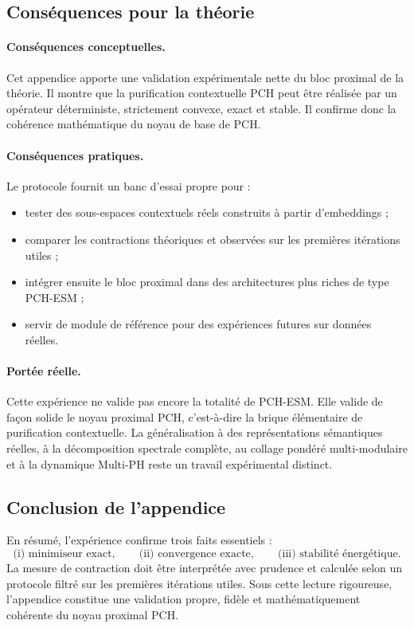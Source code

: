 \documentclass[11pt,a4paper]{article}
\newcommand{\1}{\mathbf 1}
\begin{document}
\subsection{Conséquences pour la théorie}

\paragraph{Conséquences conceptuelles.}
Cet appendice apporte une validation expérimentale nette du bloc proximal de la théorie.
Il montre que la purification contextuelle PCH peut être réalisée par un opérateur déterministe, strictement convexe, exact et stable.
Il confirme donc la cohérence mathématique du noyau de base de PCH.

\paragraph{Conséquences pratiques.}
Le protocole fournit un banc d'essai propre pour :
\begin{itemize}
    \item tester des sous-espaces contextuels réels construits à partir d'embeddings ;
    \item comparer les contractions théoriques et observées sur les premières itérations utiles ;
    \item intégrer ensuite le bloc proximal dans des architectures plus riches de type PCH-ESM ;
    \item servir de module de référence pour des expériences futures sur données réelles.
\end{itemize}

\paragraph{Portée réelle.}
Cette expérience ne valide pas encore la totalité de PCH-ESM.
Elle valide de façon solide le noyau proximal PCH, c'est-à-dire la brique élémentaire de purification contextuelle.
La généralisation à des représentations sémantiques réelles, à la décomposition spectrale complète, au collage pondéré multi-modulaire et à la dynamique Multi-PH reste un travail expérimental distinct.

\subsection{Conclusion de l'appendice}

En résumé, l'expérience confirme trois faits essentiels :
\[
\text{(i) minimiseur exact},
\qquad
\text{(ii) convergence exacte},
\qquad
\text{(iii) stabilité énergétique}.
\]
La mesure de contraction doit être interprétée avec prudence et calculée selon un protocole filtré sur les premières itérations utiles.
Sous cette lecture rigoureuse, l'appendice constitue une validation propre, fidèle et mathématiquement cohérente du noyau proximal PCH.
\end{document}
